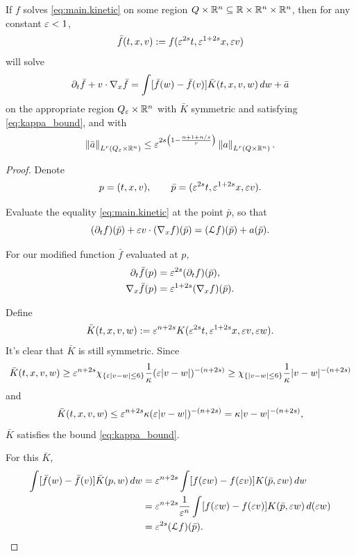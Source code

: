 \begin{lemma}[Scaling]\label{thm:scaling.kinetic}
If $f$ solves \eqref{eq:main.kinetic} on some region $Q\times \mathbb{R}^n \subseteq \mathbb{R}\times\mathbb{R}^n\times\mathbb{R}^n$, then for any constant $\varepsilon < 1$, 
\[ \bar{f}(t,x,v) := f(\varepsilon^{2s} t, \varepsilon^{1+2s} x, \varepsilon v) \]
will solve 
\[ \partial_t \bar{f} + v \cdot \nabla_x \bar{f} = \int [\bar{f}(w) - \bar{f}(v)] \bar{K}(t,x,v,w) \,dw + \bar{a} \]
on the appropriate region $Q_\varepsilon\times\mathbb{R}^n$ with $\bar{K}$ symmetric and satisfying \eqref{eq:kappa_bound}, and with 
\[ \left\lVert\bar{a}\right\rVert_{L^{r}(Q_\varepsilon\times\mathbb{R}^n)} \leq \varepsilon^{2s\left( 1 - \frac{n+1+n/s}{{r}} \right)} \left\lVert a\right\rVert_{L^{r}(Q\times\mathbb{R}^n)}. \]
\end{lemma}

\begin{proof}
Denote
\[ p = (t,x,v), \qquad \bar{p} = (\varepsilon^{2s} t, \varepsilon^{1+2s} x, \varepsilon v). \]

Evaluate the equality \eqref{eq:main.kinetic} at the point $\bar{p}$, so that
\begin{equation}\label{PDE_at_barp}
(\partial_t f)(\bar{p}) + \varepsilon v \cdot (\nabla_x f)(\bar{p}) = (\mathcal{L} f)(\bar{p}) + a(\bar{p}). 
\end{equation}

For our modified function $\bar{f}$ evaluated at $p$,
\begin{align} 
\partial_t \bar{f}(p) &= \varepsilon^{2s} (\partial_t f)(\bar{p}), \label{scaled_delt} \\
\nabla_x \bar{f}(p) &= \varepsilon^{1+2s} (\nabla_x f)(\bar{p}). \label{scaled_gradx}
\end{align}

Define
\[ \bar{K}(t,x,v,w) := \varepsilon^{n+2s} K(\varepsilon^{2s} t, \varepsilon^{1+2s} x, \varepsilon v, \varepsilon w). \]
It's clear that $\bar{K}$ is still symmetric.  Since
\[ \bar{K}(t,x,v,w) \geq \varepsilon^{n+2s} \chi_{\{\varepsilon |v-w| \leq 6\}} \frac{1}{\kappa} (\varepsilon |v-w|)^{-(n+2s)} \geq \chi_{\{|v-w| \leq 6\}} \frac{1}{\kappa} |v-w|^{-(n+2s)} \]
and 
\[ \bar{K}(t,x,v,w) \leq \varepsilon^{n+2s} \kappa (\varepsilon |v-w|)^{-(n+2s)} = \kappa |v-w|^{-(n+2s)}, \]
$\bar{K}$ satisfies the bound \eqref{eq:kappa_bound}.  

For this $\bar{K}$, 
\begin{align} 
\int [\bar{f}(w) - \bar{f}(v)] \bar{K}(p,w) \,dw &= \varepsilon^{n+2s} \int [f(\varepsilon w) - f(\varepsilon v)] K(\bar{p}, \varepsilon w) \,dw \nonumber
\\ &= \varepsilon^{n+2s} \frac{1}{\varepsilon^n} \int [f(\varepsilon w) - f(\varepsilon v)] K(\bar{p}, \varepsilon w) \,d(\varepsilon w) \nonumber
\\ &= \varepsilon^{2s} (\mathcal{L} f)(\bar{p}). \label{scaled_L}
\end{align}


\end{proof}
